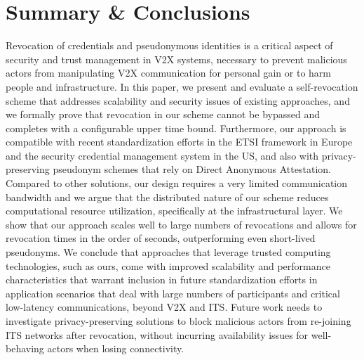 \section{Summary \& Conclusions}
%
Revocation of credentials and pseudonymous identities is a critical aspect
of security and trust management in \ac{V2X} systems, necessary to prevent
malicious actors from manipulating \ac{V2X} communication for personal gain
or to harm people and infrastructure. In this paper, we
present and evaluate a self-revocation scheme that addresses scalability and
security issues of existing approaches, and we formally prove that
revocation in our scheme cannot be bypassed and completes with a
configurable upper time bound.
%
Furthermore, our approach is compatible with recent standardization efforts in
the ETSI framework in Europe and the security credential management system in
the US, and also with privacy-preserving pseudonym schemes that rely on Direct
Anonymous Attestation.
%
Compared to other solutions, our design requires a very limited communication
bandwidth and we argue that the distributed nature of our scheme reduces
computational resource utilization, specifically at the infrastructural layer.
We show that our approach scales well to large numbers of revocations and allows
for revocation times in the order of seconds, outperforming even short-lived
pseudonyms. We conclude that approaches that leverage trusted computing
technologies, such as ours, come with improved scalability and performance
characteristics that warrant inclusion in future standardization efforts in
application scenarios that deal with large numbers of participants and critical
low-latency communications, beyond \ac{V2X} and \ac{ITS}. Future work needs to
investigate privacy-preserving solutions to block malicious actors from
re-joining \ac{ITS} networks after revocation, without incurring availability
issues for well-behaving actors when losing connectivity.

